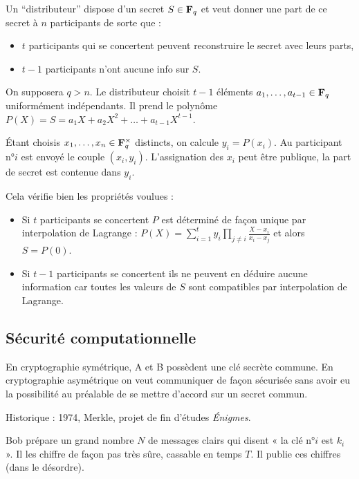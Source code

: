 	\begin{ex}
		Un “distributeur” dispose d'un secret $S \in \mathbf{F}_q$ et veut donner une part de ce secret à $n$ participants de sorte que :
		\begin{itemize}
			\item[\textbullet] $t$ participants qui se concertent peuvent reconstruire le secret avec leurs parts,
			\item[\textbullet] $t - 1$ participants n'ont aucune info sur $S$.
		\end{itemize}
		
		On supposera $q > n$.
		Le distributeur choisit $t - 1$ éléments $a_1,\ldots,a_{t-1} \in \mathbf{F}_q$ uniformément indépendants.
		Il prend le polynôme $P(X) = S = a_1 X + a_2 X^2 + \ldots + a_{t - 1} X^{t - 1}$.
		
		Étant choisis $x_1,\ldots,x_n \in \mathbf{F}_q^\times$ distincts, on calcule $y_i = P(x_i)$.
		Au participant n°$i$ est envoyé le couple $(x_i,y_i)$.
		L'assignation des $x_i$ peut être publique, la part de secret est contenue dans $y_i$.
		
		Cela vérifie bien les propriétés voulues :
		\begin{itemize}
			\item[\textbullet] Si $t$ participants se concertent $P$ est déterminé de façon unique par interpolation de Lagrange : $P(X) = \sum_{i = 1}^t y_i \prod_{j \neq i} \frac{X - x_i}{x_i - x_j}$ et alors $S = P(0)$.
			\item[\textbullet] Si $t - 1$ participants se concertent ils ne peuvent en déduire aucune information car toutes les valeurs de $S$ sont compatibles par interpolation de Lagrange.
		\end{itemize}
	\end{ex}


\subsection{Sécurité computationnelle}

	En cryptographie symétrique, A et B possèdent une clé secrète commune.
	En cryptographie asymétrique on veut communiquer de façon sécurisée sans avoir eu la possibilité au préalable de se mettre d'accord sur un secret commun.
	
	Historique : 1974, Merkle, projet de fin d'études \textit{Énigmes}.
	
	Bob prépare un grand nombre $N$ de messages clairs qui disent « la clé n°$i$ est $k_i$ ».
	Il les chiffre de façon pas très sûre, cassable en temps $T$.
	Il publie ces chiffres (dans le désordre).
	
